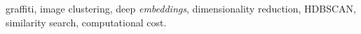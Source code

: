 graffiti, image clustering, deep \textit{embeddings},
dimensionality reduction, HDBSCAN, similarity search, computational cost.